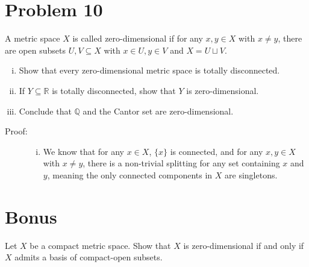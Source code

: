 \documentclass[8pt]{extarticle}
\newcommand{\Q}{\mathbb{Q}}
\newcommand{\R}{\mathbb{R}}
\begin{document}
  \section{Problem 10}%
  A metric space $X$ is called zero-dimensional if for any $x,y\in X$ with $x\neq y$, there are open subsets $U,V\subseteq X$ with $x\in U,y\in V$ and $X = U\sqcup V$.
  \begin{enumerate}[(i)]
    \item Show that every zero-dimensional metric space is totally disconnected.
    \item If $Y\subseteq \R$ is totally disconnected, show that $Y$ is zero-dimensional.
    \item Conclude that $\Q$ and the Cantor set are zero-dimensional.
  \end{enumerate}
  \begin{description}
    \item[Proof:]\hfill
      \begin{enumerate}[(i)]
        \item We know that for any $x\in X$, $\{x\}$ is connected, and for any $x,y\in X$ with $x\neq y$, there is a non-trivial splitting for any set containing $x$ and $y$, meaning the only connected components in $X$ are singletons.
      \end{enumerate}
  \end{description}
  \section{Bonus}%
  Let $X$ be a compact metric space. Show that $X$ is zero-dimensional if and only if $X$ admits a basis of compact-open subsets.
\end{document}
